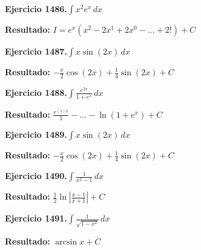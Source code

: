\documentclass[10pt,a4paper]{article}
\begin{document}
\newpage
\begin{ejbox}
\textbf{Ejercicio 1486.}\quad $\int x^{2} e^x\,dx$
\end{ejbox}

\begin{solbox}
\textbf{Resultado:} \(\displaystyle I = e^x(x^{2} - 2x^{1} + 2x^{0} - ... + 2!) + C\)
\end{solbox}

\begin{ejbox}
\textbf{Ejercicio 1487.}\quad $\int x \sin(2x)\,dx$
\end{ejbox}

\begin{solbox}
\textbf{Resultado:} \(\displaystyle -\frac{x}{2}\cos(2x) + \frac{1}{4}\sin(2x) + C\)
\end{solbox}

\begin{ejbox}
\textbf{Ejercicio 1488.}\quad $\int \frac{e^{2x}}{1+e^{x}}\,dx$
\end{ejbox}

\begin{solbox}
\textbf{Resultado:} \(\displaystyle \frac{e^{(1)x}}{1} - ... - \ln(1+e^x) + C\)
\end{solbox}

\newpage
\begin{ejbox}
\textbf{Ejercicio 1489.}\quad $\int x \sin(2x)\,dx$
\end{ejbox}

\begin{solbox}
\textbf{Resultado:} \(\displaystyle -\frac{x}{2}\cos(2x) + \frac{1}{4}\sin(2x) + C\)
\end{solbox}

\begin{ejbox}
\textbf{Ejercicio 1490.}\quad $\int \frac{1}{x^2-1}\,dx$
\end{ejbox}

\begin{solbox}
\textbf{Resultado:} \(\displaystyle \frac{1}{2}\ln\left|\frac{x-1}{x+1}\right| + C\)
\end{solbox}

\begin{ejbox}
\textbf{Ejercicio 1491.}\quad $\int \frac{1}{\sqrt{1-x^2}}\,dx$
\end{ejbox}

\begin{solbox}
\textbf{Resultado:} \(\displaystyle \arcsin x + C\)
\end{solbox}
\end{document}
